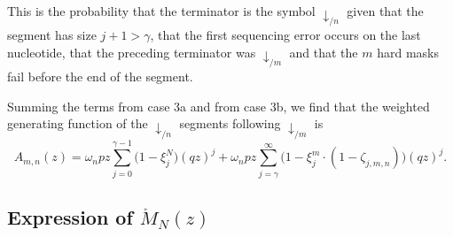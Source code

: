 \documentclass{article}
\begin{document}
This is the probability that the terminator is the symbol
$\downarrow_{/n}$ given that the segment has size $j+1 > \gamma$, that
the first sequencing error occurs on the last nucleotide, that the
preceding terminator was $\downarrow_{/m}$ and that the $m$ hard masks
fail before the end of the segment.

Summing the terms from case 3a and from case 3b, we find that the weighted
generating function of the $\downarrow_{/n}$ segments following
$\downarrow_{/m}$ is
\begin{equation}
\label{eq:A}
A_{m,n}(z) =
\omega_n pz \sum_{j=0}^{\gamma-1} \Big(1 - \xi_j^N \Big) (qz)^j + \omega_n
pz \sum_{j=\gamma}^\infty \Big(1 - \xi_j^m \cdot
(1- \zeta_{j,m,n}) \Big) (qz)^j.
\end{equation}

\subsection{Expression of $\mathring{M}_N(z)$}
\label{sec:expression_of_M}
\end{document}
